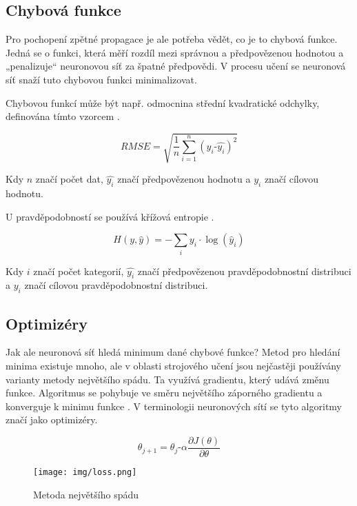\documentclass[FM,DP]{tulthesis}
\begin{document}
		\subsection{Chybová funkce}
		Pro pochopení zpětné propagace je ale potřeba vědět, co je to chybová funkce. Jedná se o funkci, která měří rozdíl mezi správnou a předpovězenou hodnotou a „penalizuje“ neuronovou síť za špatné předpovědi. V procesu učení se neuronová síť snaží tuto chybovou funkci minimalizovat. 
		
		Chybovou funkcí může být např. odmocnina střední kvadratické odchylky, definována tímto vzorcem \cite{RMSE}.
		

			\begin{equation}
				RMSE = \sqrt{\frac{1}{n}\sum_{i=1}^{n}(y_i ‑ \hat{y_i})^2}
			\end{equation}

		
		Kdy $n$ značí počet dat, $\hat{y_i}$ značí předpovězenou hodnotu a $y_i$ značí cílovou hodnotu.
		
		U pravděpodobností se používá křížová entropie \cite{cross_entropy}. 

			\begin{equation}
				H(y, \hat{y}) = - \sum_{i} y_i \cdot \log(\hat{y}_i)
			\end{equation}

		Kdy $i$ značí počet kategorií, $\hat{y_i}$ značí předpovězenou pravděpodobnostní distribuci a $y_i$ značí cílovou pravděpodobnostní distribuci.
		
		\subsection{Optimizéry}
		Jak ale neuronová síť hledá minimum dané chybové funkce? Metod pro hledání minima existuje mnoho, ale v oblasti strojového učení jsou nejčastěji používány varianty metody největšího spádu. Ta využívá gradientu, který udává změnu funkce. Algoritmus se pohybuje ve směru největšího záporného gradientu a konverguje k minimu funkce \cite{gradient_descent}. V terminologii neuronových sítí se tyto algoritmy značí jako optimizéry. %
		

			\begin{equation}
				\theta_{j+1} = \theta_j ‑ \alpha \frac{\partial J(\theta)}{\partial \theta}
			\end{equation}

	
		\begin{figure}[H]
			\centering
			\texttt{[image: img/loss.png]}
			\caption{Metoda největšího spádu \cite{general}}
			\label{fig:sgd}
		\end{figure}
		
\end{document}
